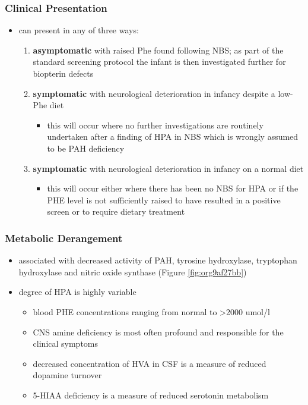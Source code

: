 \documentclass{scrartcl}
\begin{document}
\subsubsection{Clinical Presentation}
\label{sec:orgc422483}
\begin{itemize}
\item can present in any of three ways:
\begin{enumerate}
\item \textbf{asymptomatic} with raised Phe found following NBS; as part of
the standard screening protocol the infant is then investigated
further for biopterin defects
\item \textbf{symptomatic} with neurological deterioration in infancy despite a
low-Phe diet
\begin{itemize}
\item this will occur where no further investigations are routinely
undertaken after a finding of HPA in NBS which is wrongly
assumed to be PAH deficiency
\end{itemize}
\item \textbf{symptomatic} with neurological deterioration in infancy on a
normal diet
\begin{itemize}
\item this will occur either where there has been no NBS
for HPA or if the PHE level is not sufficiently raised to have
resulted in a positive screen or to require dietary treatment
\end{itemize}
\end{enumerate}
\end{itemize}
\subsubsection{Metabolic Derangement}
\label{sec:org08db122}
\begin{itemize}
\item associated with decreased activity of PAH, tyrosine hydroxylase,
tryptophan hydroxylase and nitric oxide synthase (Figure \ref{fig:org9af27bb})
\item degree of HPA is highly variable
\begin{itemize}
\item blood PHE concentrations ranging from normal to \textgreater{}2000 umol/l
\item CNS amine deficiency is most often profound and responsible for
the clinical symptoms
\item decreased concentration of HVA in CSF is a measure of reduced
dopamine turnover
\item 5-HIAA deficiency is a measure of reduced serotonin metabolism
\end{itemize}
\end{itemize}
\end{document}
